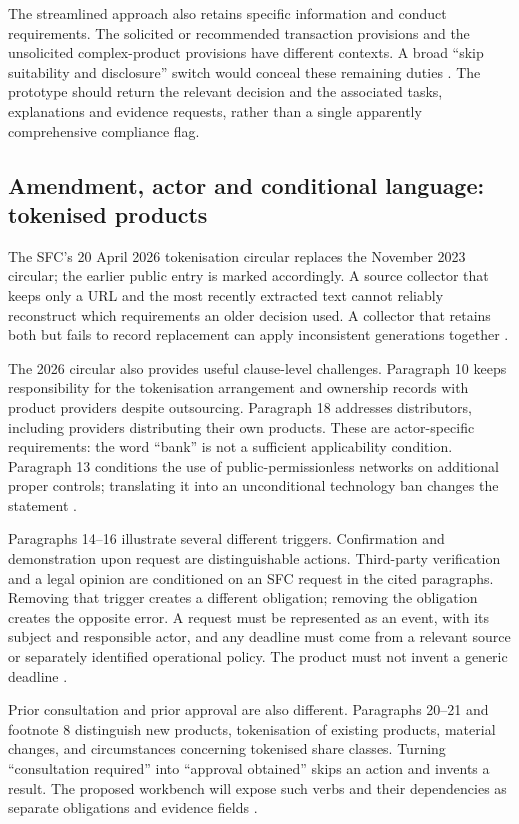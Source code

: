 The streamlined approach also retains specific information and conduct
requirements. The solicited or recommended transaction provisions and the
unsolicited complex-product provisions have different contexts. A broad
``skip suitability and disclosure'' switch would conceal these remaining duties
\citep[Annex 1, paras.~9--11]{sfcspiannex1}. The prototype should return the
relevant decision and the associated tasks, explanations and evidence requests,
rather than a single apparently comprehensive compliance flag.

\subsection{Amendment, actor and conditional language: tokenised products}

The SFC's 20 April 2026 tokenisation circular replaces the November 2023 circular;
the earlier public entry is marked accordingly. A source collector that keeps
only a URL and the most recently extracted text cannot reliably reconstruct
which requirements an older decision used. A collector that retains both but
fails to record replacement can apply inconsistent generations together
\citep{sfctoken2023,sfctoken2026}.

The 2026 circular also provides useful clause-level challenges. Paragraph 10
keeps responsibility for the tokenisation arrangement and ownership records
with product providers despite outsourcing. Paragraph 18 addresses distributors,
including providers distributing their own products. These are actor-specific
requirements: the word ``bank'' is not a sufficient applicability condition.
Paragraph 13 conditions the use of public-permissionless networks on additional
proper controls; translating it into an unconditional technology ban changes the
statement \citep[paras.~10, 13, 18]{sfctoken2026}.

Paragraphs 14--16 illustrate several different triggers. Confirmation and
demonstration upon request are distinguishable actions. Third-party verification
and a legal opinion are conditioned on an SFC request in the cited paragraphs.
Removing that trigger creates a different obligation; removing the obligation
creates the opposite error. A request must be represented as an event, with its
subject and responsible actor, and any deadline must come from a relevant source
or separately identified operational policy. The product must not invent a
generic deadline \citep[paras.~14--16]{sfctoken2026}.

Prior consultation and prior approval are also different. Paragraphs 20--21 and
footnote 8 distinguish new products, tokenisation of existing products, material
changes, and circumstances concerning tokenised share classes. Turning
``consultation required'' into ``approval obtained'' skips an action and invents
a result. The proposed workbench will expose such verbs and their dependencies
as separate obligations and evidence fields \citep[paras.~20--21 and n.~8]{sfctoken2026}.

